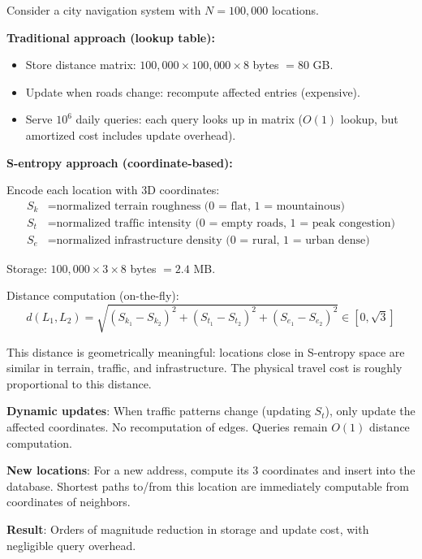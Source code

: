 \documentclass[twocolumn,11pt,a4paper]{article}
\newcommand{\Sk}{S_{k}}
\newcommand{\St}{S_{t}}
\newcommand{\Se}{S_{e}}
\begin{document}
\begin{application}

Consider a city navigation system with $N = 100,000$ locations.

\textbf{Traditional approach (lookup table):}
\begin{itemize}[nosep]
  \item Store distance matrix: $100,000 \times 100,000 \times 8$ bytes $= 80$ GB.
  \item Update when roads change: recompute affected entries (expensive).
  \item Serve $10^6$ daily queries: each query looks up in matrix ($O(1)$ lookup, but amortized cost includes update overhead).
\end{itemize}

\textbf{S-entropy approach (coordinate-based):}

Encode each location with 3D coordinates:
\begin{align}
\Sk &= \text{normalized terrain roughness (0 = flat, 1 = mountainous)} \\
\St &= \text{normalized traffic intensity (0 = empty roads, 1 = peak congestion)} \\
\Se &= \text{normalized infrastructure density (0 = rural, 1 = urban dense)}
\end{align}

Storage: $100,000 \times 3 \times 8$ bytes $= 2.4$ MB.

Distance computation (on-the-fly):
\begin{equation}
d(L_1, L_2) = \sqrt{(\Sk_1 - \Sk_2)^2 + (\St_1 - \St_2)^2 + (\Se_1 - \Se_2)^2} \in [0, \sqrt{3}]
\end{equation}

This distance is geometrically meaningful: locations close in S-entropy space are similar in terrain, traffic, and infrastructure. The physical travel cost is roughly proportional to this distance.

\textbf{Dynamic updates}: When traffic patterns change (updating $\St$), only update the affected coordinates. No recomputation of edges. Queries remain $O(1)$ distance computation.

\textbf{New locations}: For a new address, compute its 3 coordinates and insert into the database. Shortest paths to/from this location are immediately computable from coordinates of neighbors.

\textbf{Result}: Orders of magnitude reduction in storage and update cost, with negligible query overhead.
\end{application}
\end{document}
